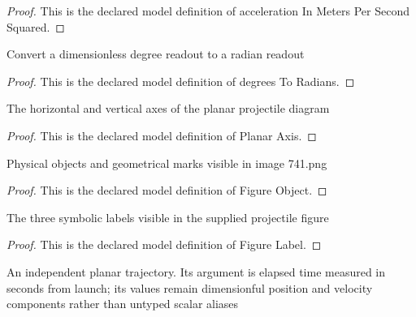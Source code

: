 \begin{proof}
  This is the declared model definition of acceleration In Meters Per Second Squared.
\end{proof}
\begin{definition}
  \label{def:physics:phyx-mini-0741:phyxminiproblems-problemphyxmini0741-degreestoradians}
  Convert a dimensionless degree readout to a radian readout
\end{definition}
\begin{proof}
  This is the declared model definition of degrees To Radians.
\end{proof}
\begin{definition}
  \label{def:physics:phyx-mini-0741:phyxminiproblems-problemphyxmini0741-planaraxis}
  The horizontal and vertical axes of the planar projectile diagram
\end{definition}
\begin{proof}
  This is the declared model definition of Planar Axis.
\end{proof}
\begin{definition}
  \label{def:physics:phyx-mini-0741:phyxminiproblems-problemphyxmini0741-figureobject}
  Physical objects and geometrical marks visible in image 741.png
\end{definition}
\begin{proof}
  This is the declared model definition of Figure Object.
\end{proof}
\begin{definition}
  \label{def:physics:phyx-mini-0741:phyxminiproblems-problemphyxmini0741-figurelabel}
  The three symbolic labels visible in the supplied projectile figure
\end{definition}
\begin{proof}
  This is the declared model definition of Figure Label.
\end{proof}
\begin{definition}
  \label{def:physics:phyx-mini-0741:phyxminiproblems-problemphyxmini0741-planarprojectiletrajectory}
  An independent planar trajectory. Its argument is elapsed time measured in seconds from launch; its values remain dimensionful position and velocity components rather than untyped scalar aliases
\end{definition}
